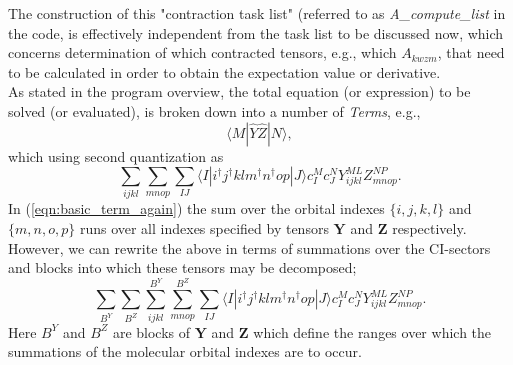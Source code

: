 \documentclass[12pt]{article}
\begin{document}
\noindent  The construction of this "contraction task list" (referred to as \emph{A\_compute\_list} in the code, 
is effectively independent from the task list to be discussed now, which concerns determination of which
contracted tensors, e.g., which $A_{kwzm}$, that need to be calculated in order to obtain the expectation value
or derivative.\\

\noindent As stated in the program overview, the total equation (or expression) to be solved (or evaluated), is 
broken down into a number of \emph{Terms}, e.g., 
\begin{equation*}
\langle M | \hat{Y}\hat{Z} | N \rangle ,
\end{equation*}
which using second quantization as
\begin{equation}
\sum_{ijkl}\sum_{mnop} \sum_{IJ} \langle I | i^{\dagger}j^{\dagger}klm^{\dagger}n^{\dagger}op | J \rangle c^{M}_{I} c_{J}^{N} Y^{ML}_{ijkl}Z^{NP}_{mnop}.
\label{eqn:basic_term_again}
\end{equation}
\noindent In (\ref{eqn:basic_term_again}) the sum over the orbital indexes
$\{i,j,k,l\}$ and  $\{m,n,o,p\}$ runs over all indexes specified by tensors
$\mathbf{Y}$ and $\mathbf{Z}$ respectively. However, we can rewrite the above
in terms of summations over the CI-sectors and blocks into which these tensors may be
decomposed;
\begin{equation}
\sum_{B^{Y}}\sum_{B^{Z}}
\sum^{B^{Y}}_{ijkl}\sum^{B^{Z}}_{mnop} \sum_{IJ} \langle I | i^{\dagger}j^{\dagger}klm^{\dagger}n^{\dagger}op | J \rangle c^{M}_{I} c_{J}^{N} Y^{ML}_{ijkl}Z^{NP}_{mnop}.
\label{eqn:basic_term_block_wise}
\end{equation}
\noindent Here $B^{Y}$ and $B^{Z}$ are blocks of $\mathbf{Y}$ and $\mathbf{Z}$
which define the ranges over which the summations of the molecular orbital
indexes are to occur.\\
\end{document}
